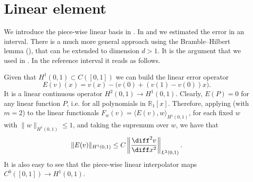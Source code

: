 
\section{Linear element}

We introduce the piece-wise linear basis in .
In  and  we estimated the error in an interval. There is a much more general approach using the Bramble--Hilbert lemma (), that can be extended to dimension $d > 1$.
It is the argument that we used in . In the reference interval it reads as follows.

Given that $H^1(0,1) \subset C([0,1])$ we can build the linear error operator
\begin{equation*}
    E(v) (x) = v (x) - \Big( v(0) + (v(1) - v(0))x \Big).
\end{equation*}
It is a linear continuous operator $H^2 (0,1) \to H^1(0,1)$.
Clearly, $E(P) = 0$ for any linear function $P$, i.e. for all polynomials in $\mathbb R_1[x]$. Therefore, applying  (with $m = 2$) to the linear functionals $F_w(v) = \langle E(v), w \rangle_{H^1(0,1)}$, for each fixed $w$ with $\|w\|_{H^1(0,1)} \le 1$, and taking the supremum over $w$, we have that
\begin{equation*}
    \| E(v) \|_{H^1(0,1)} \le C \left\|\frac{\diff^2 v}{\diff x^2}\right\|_{L^2(0,1)}.
\end{equation*}
It is also easy to see that the piece-wise linear interpolator maps $C^0 ([0,1]) \to H^1(0,1)$.

